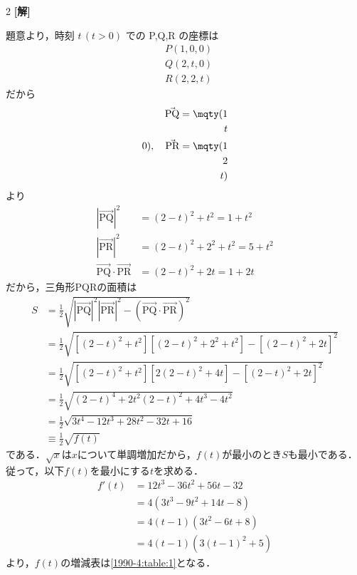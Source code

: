 \documentclass[../../../../main.tex]{subfiles}
\begin{document}
\setcounter{equation}{0}
\begin{oframed}
  
\end{oframed}
\setlength{\columnseprule}{0.4pt}
\begin{multicols}{2}
  {\bf[解]}

  題意より，時刻 $t\, (t>0)$ での P,Q,R の座標は
  \begin{align*}
     & P(1,0,0) \\
     & Q(2,t,0) \\
     & R(2,2,t)
  \end{align*}
  だから
  \begin{align*}
    \vec{\text{PQ}} = \mqty(1 \\ t \\ 0 ), \quad \vec{\text{PR}} = \mqty(1 \\ 2 \\ t)
  \end{align*}
  より
  \begin{align*}
    |\vec{\text{PQ}}|^2                   & = (2-t)^2+t^2    = 1+t^2 \\
    |\vec{\text{PR}}|^2                   & = (2-t)^2+2^2+t^2= 5+t^2 \\
    \vec{\text{PQ}} \cdot \vec{\text{PR}} & = (2-t)^2+2t     = 1+2t
  \end{align*}
  だから，三角形PQRの面積は
  \begin{align*}
    S
     & = \frac{1}{2} \sqrt{|\vec{\text{PQ}}|^2 |\vec{\text{PR}}|^2 - (\vec{\text{PQ}} \cdot \vec{\text{PR}})^2} \\
     & = \frac{1}{2} \sqrt{\left[(2-t)^2+t^2\right]\left[(2-t)^2+2^2+t^2\right] - \left[(2-t)^2+2t\right]^2}    \\
     & = \frac{1}{2} \sqrt{\left[(2-t)^2+t^2\right]\left[2(2-t)^2+4t\right] - \left[(2-t)^2+2t\right]^2}        \\
     & = \frac{1}{2} \sqrt{(2-t)^4+2t^2(2-t)^2+4t^3-4t^2}                                                       \\
     & = \frac{1}{2} \sqrt{3t^4-12t^3+28t^2-32t+16}                                                             \\
     & \equiv \frac{1}{2}\sqrt{f(t)}
  \end{align*}
  である．$\sqrt{x}$は$x$について単調増加だから，$f(t)$が最小のとき$S$も最小である．
  従って，以下$f(t)$を最小にする$t$を求める．
  \begin{align*}
    f'(t)
     & = 12t^3-36t^2+56t-32 \\
     & = 4(3t^3-9t^2+14t-8) \\
     & = 4(t-1)(3t^2-6t+8)  \\
     & = 4(t-1)(3(t-1)^2+5)
  \end{align*}
  より，$f(t)$の増減表は\cref{1990-4:table:1}となる．


\end{multicols}
\end{document}
